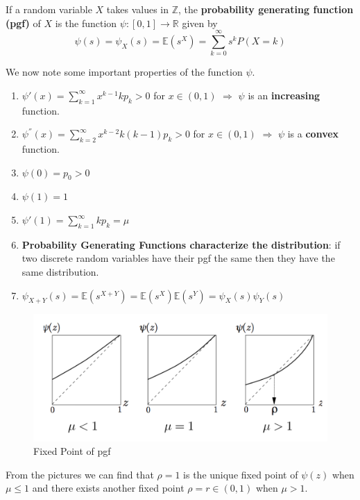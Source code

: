 \documentclass[11pt]{elegantbook}
\begin{document}
\begin{definition}
    If a random variable $X$ takes values in $\mathbb{Z}$, the \textbf{probability generating function (pgf)} of $X$ is the function $\psi : [0,1] \rightarrow \mathbb{R}$ given by $$\psi(s)=\psi_X(s)=\mathbb{E}(s^X)=\sum_{k=0}^\infty s^k P(X=k)$$
\end{definition}

We now note some important properties of the function $\psi$.
\begin{enumerate}
    \item $\psi'(x)=\sum_{k=1}^\infty x^{k-1}k p_k>0$ for $x\in (0,1)$ $\Rightarrow$ $\psi$ is an \textbf{increasing} function.
    \item $\psi^{''}(x)=\sum_{k=2}^\infty x^{k-2}k(k-1) p_k>0$ for $x\in (0,1)$ $\Rightarrow$ $\psi$ is a \textbf{convex} function.
    \item $\psi(0)=p_0>0$
    \item $\psi(1)=1$
    \item $\psi'(1)=\sum_{k=1}^\infty k p_k=\mu$
    \item \textbf{Probability Generating Functions characterize the distribution}: if two discrete random variables have their pgf the same then they have the same distribution.
    \item $\psi_{X+Y}(s)=\mathbb{E}(s^{X+Y})=\mathbb{E}(s^X)\mathbb{E}(s^Y)=\psi_X(s)\psi_Y(s)$
\end{enumerate}

\begin{center}\begin{figure}[htbp]
    \centering
    \includegraphics[scale=0.2]{pgf.png}
    \caption{Fixed Point of pgf}
    \label{}
\end{figure}\end{center}

From the pictures we can find that $\rho=1$ is the unique fixed point of $\psi(z)$ when $\mu\leq 1$ and there exists another fixed point $\rho=r\in (0,1)$ when $\mu>1$.
\end{document}
